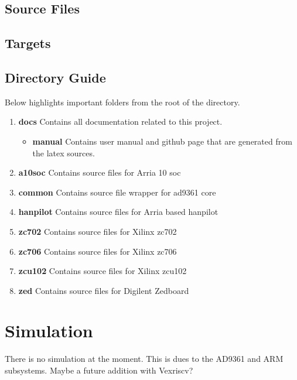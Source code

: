 \subsection{Source Files}



\subsection{Targets} \label{targets}



\subsection{Directory Guide}

\par
Below highlights important folders from the root of the directory.

\begin{enumerate}
  \item \textbf{docs} Contains all documentation related to this project.
    \begin{itemize}
      \item \textbf{manual} Contains user manual and github page that are generated from the latex sources.
    \end{itemize}
  \item \textbf{a10soc} Contains source files for Arria 10 soc
  \item \textbf{common} Contains source file wrapper for ad9361 core
  \item \textbf{hanpilot} Contains source files for Arria based hanpilot
  \item \textbf{zc702} Contains source files for Xilinx zc702
  \item \textbf{zc706} Contains source files for Xilinx zc706
  \item \textbf{zcu102} Contains source files for Xilinx zcu102
  \item \textbf{zed} Contains source files for Digilent Zedboard
\end{enumerate}

\newpage

\section{Simulation}
\par
There is no simulation at the moment. This is dues to the AD9361 and ARM subsystems. Maybe a future addition with Vexriscv?

